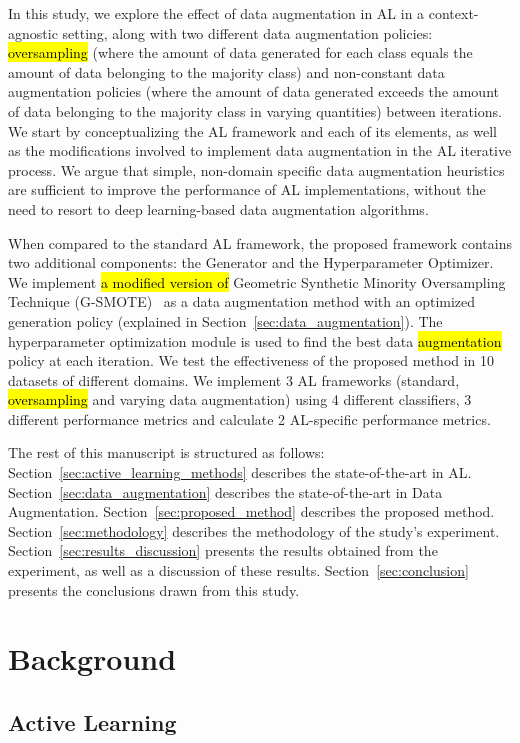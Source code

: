 \documentclass[preprint, 12pt]{elsarticle}
\begin{document}
In this study, we explore the effect of data augmentation in AL in a
context-agnostic setting, along with two different data augmentation policies:
\hl{oversampling} (where the amount of data generated for each class equals
the amount of data belonging to the majority class) and non-constant data
augmentation policies (where the amount of data generated exceeds the amount
of data belonging to the majority class in varying quantities) between
iterations. We start by conceptualizing the AL framework and each of its
elements, as well as the modifications involved to implement data augmentation
in the AL iterative process. We argue that simple, non-domain specific data
augmentation heuristics are sufficient to improve the performance of AL
implementations, without the need to resort to deep learning-based data
augmentation algorithms.

When compared to the standard AL framework, the proposed framework contains
two additional components: the Generator and the Hyperparameter Optimizer. We
implement \hl{a modified version of }Geometric Synthetic Minority Oversampling
Technique (G-SMOTE)~\cite{Douzas2019} as a data augmentation method with an
optimized generation policy (explained in
Section~\ref{sec:data_augmentation}). The hyperparameter optimization module
is used to find the best data \hl{augmentation} policy at each iteration. We test the
effectiveness of the proposed method in 10 datasets of different domains. We
implement 3 AL frameworks (standard, \hl{oversampling} and varying
data augmentation) using 4 different classifiers, 3 different performance
metrics and calculate 2 AL-specific performance metrics. 

The rest of this manuscript is structured as follows:
Section~\ref{sec:active_learning_methods} describes the state-of-the-art in
AL\@. Section~\ref{sec:data_augmentation} describes the state-of-the-art in Data
Augmentation. Section~\ref{sec:proposed_method} describes the proposed method.
Section~\ref{sec:methodology} describes the methodology of the study's
experiment. Section~\ref{sec:results_discussion} presents the results obtained
from the experiment, as well as a discussion of these results.
Section~\ref{sec:conclusion} presents the conclusions drawn from this study.
 
\section{Background}

\subsection{Active Learning}~\label{sec:active_learning_methods}
\end{document}
